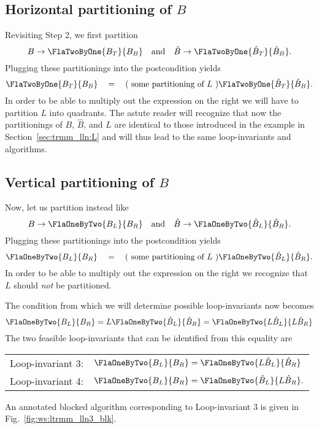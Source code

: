 \subsection{Horizontal partitioning of $ B$}

Revisiting Step 2, we first partition
\[
B \rightarrow \FlaTwoByOne{ B_{T}}{ B_{B} }
\quad
\mbox{and}
\quad
\hat{B} \rightarrow \FlaTwoByOne{ \hat{B}_{T}}{ \hat{B}_{B} }.
\]
Plugging these partitionings into the postcondition yields
\[
\FlaTwoByOne{ B_{T}}{ B_{B} }
\quad
=
\quad
( \mbox{ some partitioning of $ L $ } )
\FlaTwoByOne{ \hat{B}_{T}}{ \hat{B}_{B} }.
\]
In order to be able to multiply out the expression on the right we
will have to partition $ L $ into quadrants.  The astute reader will
recognize that now the partitionings of $ B $, $ \hat{B} $, and $ L $
are identical to those introduced in the example in
Section~\ref{sec:trmm_lln:L} and will thus lead to the same
loop-invariants and algorithms.

\subsection{Vertical partitioning of $ B$}

Now, let us partition instead like
\[
B \rightarrow \FlaOneByTwo{ B_{L}}{ B_{R} }
\quad
\mbox{and}
\quad
\hat{B} \rightarrow \FlaOneByTwo{ \hat{B}_{L}}{ \hat{B}_{R} }.
\]
Plugging these partitionings into the postcondition yields
\[
\FlaOneByTwo{ B_{L}}{ B_{R} }
\quad
=
\quad
( \mbox{ some partitioning of $ L $ } )
\FlaOneByTwo{ \hat{B}_{L}}{ \hat{B}_{R} }.
\]
In order to be able to multiply out the expression on the right we
recognize that $ L $ should {\em not} be partitioned.

The condition from which we will determine possible loop-invariants
now becomes
\[
\FlaOneByTwo{ B_{L}}{ B_{R} }
=
L
\FlaOneByTwo{ \hat{B}_{L}}{ \hat{B}_{R} }
=
\FlaOneByTwo{ L \hat{B}_{L}}{ L \hat{B}_{R} }
\]
The two feasible loop-invariants that can be identified from this
equality are
\begin{center}
\begin{tabular}{p{1.5in}  l}
Loop-invariant 3: & 
$
\FlaOneByTwo{ B_{L}}{ B_{R} }
=
\FlaOneByTwo{ L \hat{B}_{L}}{ \hat{B}_{R} }
$ \\ 
Loop-invariant 4: & 
$
\FlaOneByTwo{ B_{L}}{ B_{R} }
=
\FlaOneByTwo{ \hat{B}_{L}}{ L \hat{B}_{R} }.
$
\end{tabular}
\end{center}
An annotated blocked algorithm corresponding to Loop-invariant 3 is
given in Fig.~\ref{fig:ws:ltrmm_lln3_blk}.


